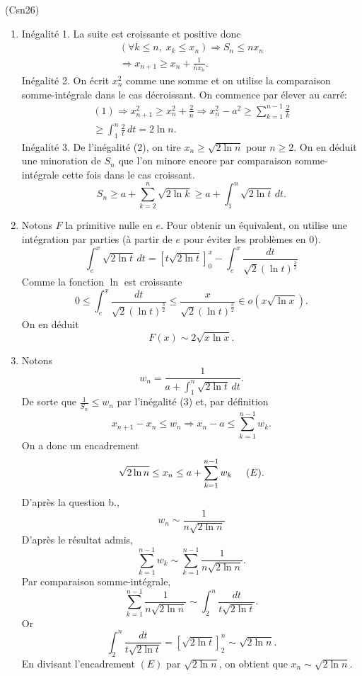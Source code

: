 \begin{tiny}(Csn26)\end{tiny} 
\begin{enumerate}
 \item Inégalité 1.\newline
La suite est croissante et positive donc
\begin{multline*}
\left( \forall k \leq n, \; x_k \leq x_n\right) 
 \Rightarrow S_n \leq nx_n \\
 \Rightarrow x_{n+1} \geq x_n + \frac{1}{nx_n}. 
\end{multline*}
Inégalité 2.\newline
On écrit $x_n^2$ comme une somme et on utilise la comparaison somme-intégrale dans le cas décroissant. On commence par élever au carré:
\begin{multline*}
 (1)\Rightarrow x_{n+1}^2 \geq x_n^2 + \frac{2}{n}
 \Rightarrow 
 x_n^2 - a^2 \geq \sum_{k=1}^{n-1}\frac{2}{k}\\
 \geq \int_1^n\frac{2}{t}\, dt = 2\ln n. 
\end{multline*}
Inégalité 3.\newline
De l'inégalité (2), on tire $x_n \geq \sqrt{2 \ln n}$ pour $n\geq 2$. On en déduit une minoration de $S_n$ que l'on minore encore par comparaison somme-intégrale cette fois dans le cas croissant.
\[
 S_n \geq a + \sum_{k=2}^{n}\sqrt{2\ln k} 
 \geq  a + \int_1^n \sqrt{2 \ln t}\, dt.
\]

 \item Notons $F$ la primitive nulle en $e$. Pour obtenir un équivalent, on utilise une intégration par parties (à partir de $e$ pour éviter les problèmes en $0$).
\[
 \int_e^x \sqrt{2\ln t}\,dt =
\left[ t \sqrt{2\ln t} \right]_0^x - \int_e^x \frac{dt}{\sqrt{2}(\ln t)^{\frac{3}{2}}} 
\]
Comme la fonction $\ln$ est croissante
\[
 0 \leq \int_e^x \frac{dt}{\sqrt{2}(\ln t)^{\frac{3}{2}}} \leq \frac{x}{\sqrt{2}(\ln t)^{\frac{3}{2}}}
 \in o(x \sqrt{\ln x}).
\]
On en déduit 
\[
 F(x) \sim 2\sqrt{x\ln x}.
\]
\item Notons
\[
 w_n = \frac{1}{a + \int_1^n \sqrt{2 \ln t}\, dt}.
\]
De sorte que $\frac{1}{S_n}\leq w_n$ par l'inégalité (3) et, par définition
\[
 x_{n+1} - x_n \leq w_n 
 \Rightarrow
 x_n - a \leq \sum_{k=1}^{n-1}w_k.
\]
On a donc un encadrement
\[
 \sqrt{2 \ln n} \leq x_n \leq a + \sum_{k=1}^{n-1}w_k \hspace{0.5cm} (E).
\]
D'après la question b.,
\[
 w_n \sim \frac{1}{n\sqrt{2 \ln n}}
\]
D'après le résultat admis,
\[
 \sum_{k=1}^{n-1}w_k \sim \sum_{k=1}^{n-1}\frac{1}{n\sqrt{2 \ln n}}.
\]
Par comparaison somme-intégrale,
\[
 \sum_{k=1}^{n-1}\frac{1}{n\sqrt{2 \ln n}} \sim \int_2^n \frac{dt}{t\sqrt{2 \ln t}}.
\]
Or
\[
 \int_2^n \frac{dt}{t\sqrt{2 \ln t}}=
 \left[ \sqrt{2 \ln t}\right]_2^n \sim \sqrt{2 \ln n} .
\]
En divisant l'encadrement $(E)$ par $\sqrt{2 \ln n}$, on obtient que $x_n \sim \sqrt{2 \ln n}$.
\end{enumerate}
